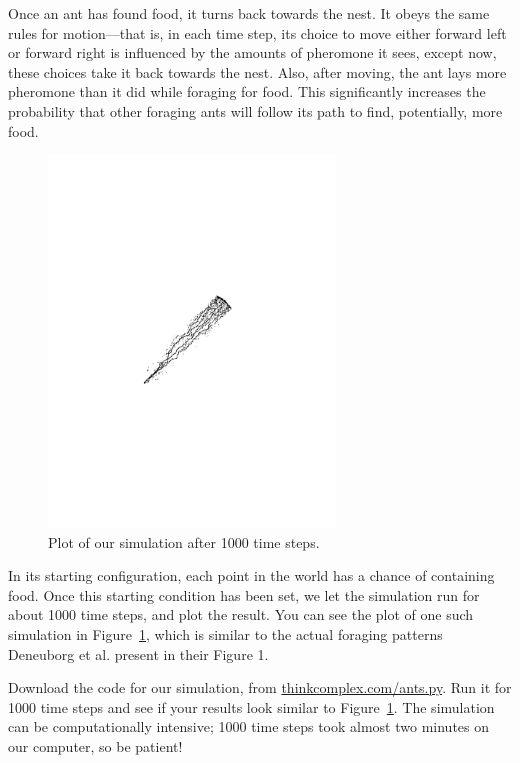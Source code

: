\documentclass[10pt]{book}
\begin{document}
Once an ant has found food, it turns back towards the nest. It obeys
the same rules for motion---that is, in each time step, its choice to
move either forward left or forward right is influenced by the amounts
of pheromone it sees, except now, these choices take it back towards
the nest. Also, after moving, the ant lays more pheromone than it did
while foraging for food. This significantly increases the probability
that other foraging ants will follow its path to find, potentially,
more food.

\begin{figure}[ht]
\centerline{\includegraphics[width=3.0in]{figs/plot.pdf}}
\caption{Plot of our simulation after 1000 time steps.\label{fig.plot}}
\end{figure}

In its starting configuration, each point in the world has a chance of
containing food. Once this starting condition has been set, we let the
simulation run for about 1000 time steps, and plot the result. You can
see the plot of one such simulation in Figure~\ref{fig.plot}, which is
similar to the actual foraging patterns
Deneuborg et al. present in their Figure 1.


\begin{exercise}

Download the code for our simulation, from
\url{thinkcomplex.com/ants.py}.  Run it for 1000 time steps and see if
your results look similar to Figure~\ref{fig.plot}. The simulation can
be computationally intensive; 1000 time steps took almost two
minutes on our computer, so be patient!
\end{exercise}
\end{document}
